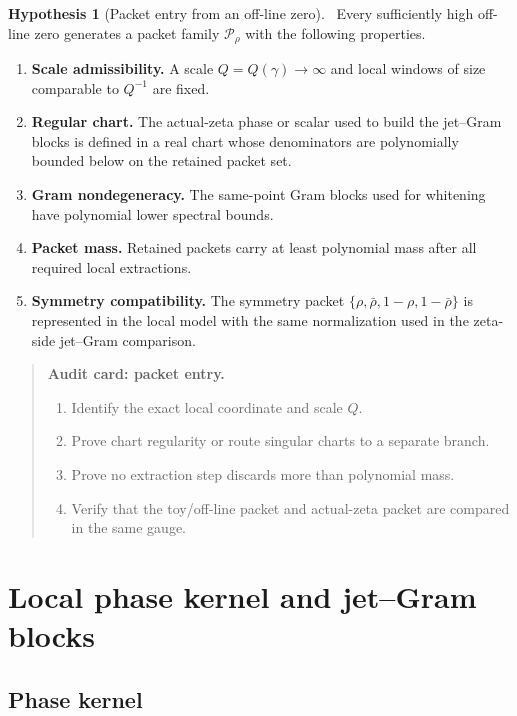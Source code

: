 \documentclass[11pt,a4paper]{amsart}
\newcommand{\Status}[1]{\textnormal{\fbox{\scriptsize\textsf{#1}}}}
\newcommand{\Open}{\Status{OPEN}}
\newcommand{\Packet}{\mathcal P}
\newcommand{\Scale}{Q}
\theoremstyle{plain}
\theoremstyle{definition}
\newtheorem{hypothesis}[theorem]{Hypothesis}
\newenvironment{audit}[1]{%
  \begin{quote}\noindent\textbf{Audit card: #1.}\par\smallskip\small
}{\end{quote}}
\begin{document}
\begin{hypothesis}[Packet entry from an off-line zero]
\label{hyp:packet-entry}
\Open\
Every sufficiently high off-line zero generates a packet family \(\Packet_\rho\) with the following properties.
\begin{enumerate}[label=\textup{E\arabic*.},leftmargin=*]
\item \textbf{Scale admissibility.}  A scale \(\Scale=\Scale(\gamma)\to\infty\) and local windows of size comparable to \(\Scale^{-1}\) are fixed.
\item \textbf{Regular chart.}  The actual-zeta phase or scalar used to build the jet--Gram blocks is defined in a real chart whose denominators are polynomially bounded below on the retained packet set.
\item \textbf{Gram nondegeneracy.}  The same-point Gram blocks used for whitening have polynomial lower spectral bounds.
\item \textbf{Packet mass.}  Retained packets carry at least polynomial mass after all required local extractions.
\item \textbf{Symmetry compatibility.}  The symmetry packet \(\{\rho,\bar\rho,1-\rho,1-\bar\rho\}\) is represented in the local model with the same normalization used in the zeta-side jet--Gram comparison.
\end{enumerate}
\end{hypothesis}

\begin{audit}{packet entry}
\begin{enumerate}[label=\textup{A\arabic*.},leftmargin=*]
\item Identify the exact local coordinate and scale \(\Scale\).
\item Prove chart regularity or route singular charts to a separate branch.
\item Prove no extraction step discards more than polynomial mass.
\item Verify that the toy/off-line packet and actual-zeta packet are compared in the same gauge.
\end{enumerate}
\end{audit}

\section{Local phase kernel and jet--Gram blocks}
\label{sec:local-phase-kernel-jetgram}

\subsection{Phase kernel}
\label{subsec:phase-kernel}
\end{document}

